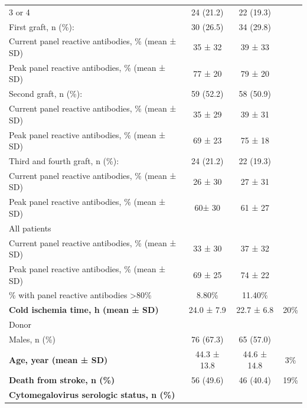\documentclass{article}
\begin{document}
\begin{center}
\begin{table}[!ht]
\begin{tabular*}{\textwidth}{@{\extracolsep\fill}lccc@{}}
\hspace{5mm} 3 or 4 & 24 (21.2) & 22 (19.3)  & \\
First graft, n (\%): & 30 (26.5) & 34 (29.8) & \\
\hspace{5mm}Current panel reactive antibodies, \% (mean ± SD) & 35 ± 32 & 39 ± 33 & \\
\hspace{5mm}Peak panel reactive antibodies, \% (mean ± SD) & 77 ± 20 & 79 ± 20 & \\
Second graft, n (\%): & 59 (52.2) & 58 (50.9) & \\
\hspace{5mm}Current panel reactive antibodies, \% (mean ± SD) & 35 ± 29 & 39 ± 31 & \\
\hspace{5mm}Peak panel reactive antibodies, \% (mean ± SD) & 69 ± 23 & 75 ± 18 & \\
Third and fourth graft, n (\%): & 24 (21.2) & 22 (19.3) & \\
\hspace{5mm}Current panel reactive antibodies, \% (mean ± SD) & 26 ± 30 & 27 ± 31 & \\
\hspace{5mm}Peak panel reactive antibodies, \% (mean ± SD) & 60±  30 & 61 ± 27 & \\
All patients & & & \\
\hspace{5mm}Current panel reactive antibodies, \% (mean ± SD) & 33 ± 30 & 37 ± 32 & \\
\hspace{5mm}Peak panel reactive antibodies, \% (mean ± SD) & 69 ± 25 & 74 ± 22&  \\
\hspace{5mm}\% with panel reactive antibodies >80\% & 8.80\% & 11.40\% & \\
\textbf{Cold ischemia time, h (mean ± SD)} & 24.0 ± 7.9 & 22.7 ± 6.8 & 20\% \\
Donor  \\
\hspace{5mm}Males, n (\%) & 76 (67.3) & 65 (57.0) & \\
\textbf{\hspace{5mm}Age, year (mean ± SD)} & 44.3 ± 13.8 & 44.6 ± 14.8 & 3\% \\
\textbf{\hspace{5mm}Death from stroke, n (\%)} & 56 (49.6) & 46 (40.4) & 19\% \\
\textbf{Cytomegalovirus serologic status, n (\%)} & & & \\

\end{tabular*}
\end{table}
\end{center}
\end{document}
